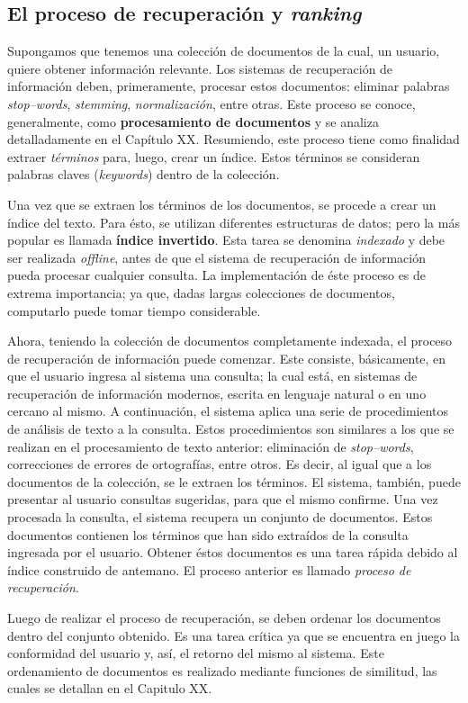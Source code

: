 	\subsection{El proceso de recuperación y \textit{ranking}}
		Supongamos que tenemos una colección de documentos de la cual, un usuario, quiere obtener información relevante. Los sistemas de 	recuperación de información deben, primeramente, procesar estos documentos: eliminar palabras \textit{stop--words}, \textit{stemming}, \textit{normalización}, entre otras. Este proceso se conoce, generalmente, como \textbf{procesamiento de documentos} y se analiza detalladamente en el Capítulo XX. Resumiendo, este proceso tiene como finalidad extraer \textit{términos} para, luego, crear un índice. Estos términos se consideran palabras claves (\textit{keywords}) dentro de la colección. \par

		Una vez que se extraen los términos de los documentos, se procede a crear un índice del texto. Para ésto, se utilizan diferentes estructuras de datos; pero la más popular es llamada \textbf{índice invertido}. Esta tarea se denomina \textit{indexado} y debe ser realizada \textit{offline}, antes de que el sistema de recuperación de información pueda procesar cualquier consulta. La implementación de éste proceso es de extrema importancia; ya que, dadas largas colecciones de documentos, computarlo puede tomar tiempo considerable. \par

		Ahora, teniendo la colección de documentos completamente indexada, el proceso de recuperación de información puede comenzar. Este consiste, básicamente, en que el usuario ingresa al sistema una consulta; la cual está, en sistemas de recuperación de información modernos, escrita en lenguaje natural o en uno cercano al mismo. A continuación, el sistema aplica una serie de procedimientos de análisis de texto a la consulta. Estos procedimientos son similares a los que se realizan en el procesamiento de texto anterior: eliminación de \textit{stop--words}, correcciones de errores de ortografías, entre otros. Es decir, al igual que a los documentos de la colección, se le extraen los términos. El sistema, también, puede presentar al usuario consultas sugeridas, para que el mismo confirme. Una vez procesada la consulta, el sistema recupera un conjunto de documentos. Estos documentos contienen los términos que han sido extraídos de la consulta ingresada por el usuario. Obtener éstos documentos es una tarea rápida debido al índice construido de antemano. El proceso anterior es llamado \textit{proceso de recuperación}. \par

		Luego de realizar el proceso de recuperación, se deben ordenar los documentos dentro del conjunto obtenido. Es una tarea crítica ya que se encuentra en juego la conformidad del usuario y, así, el retorno del mismo al sistema. Este ordenamiento de documentos es realizado mediante funciones de similitud, las cuales se detallan en el Capitulo XX.